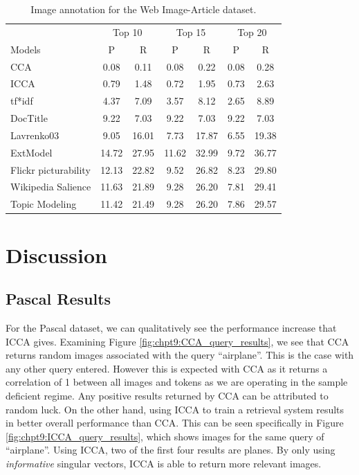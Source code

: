 \begin{table}[t]
\centering
\begin{tabular}{l|cc|cc|cc}
& \multicolumn{2}{|c|}{Top 10} & \multicolumn{2}{|c|}{Top 15} & \multicolumn{2}{|c|}{Top
  20}\\
Models & P & R & P & R & P & R\\ 
\midrule
CCA & 0.08 & 0.11 & 0.08 & 0.22 & 0.08 & 0.28\\
ICCA & 0.79 & 1.48 & 0.72 & 1.95 & 0.73 & 2.63\\
\midrule
\midrule
tf*idf & 4.37 & 7.09 & 3.57 & 8.12 & 2.65 & 8.89\\
DocTitle & 9.22 & 7.03 & 9.22 & 7.03 & 9.22 & 7.03\\
Lavrenko03 & 9.05 & 16.01 & 7.73 & 17.87 & 6.55 & 19.38\\
ExtModel & 14.72 & 27.95 & 11.62 & 32.99 & 9.72 & 36.77\\
\midrule
\midrule
Flickr picturability & 12.13 & 22.82 & 9.52 & 26.82 & 8.23 & 29.80\\
Wikipedia Salience & 11.63 & 21.89 & 9.28 & 26.20 & 7.81 & 29.41\\
Topic Modeling & 11.42 & 21.49 & 9.28 & 26.20 & 7.86 & 29.57\\
\bottomrule
\end{tabular}
\caption{Image annotation for the Web Image-Article dataset.}
\label{table:bbc}
\vspace{-0.1in}
\end{table}

\section{Discussion}\label{sec:disc}
\subsection{Pascal Results}

For the Pascal dataset, we can qualitatively see the performance increase that ICCA
gives. Examining Figure \ref{fig:chpt9:CCA_query_results}, we see that CCA returns random
images associated with the query ``airplane''. This is the case with any other query
entered.  However this is expected with CCA as it returns a correlation of 1 between all
images and tokens as we are operating in the sample deficient regime.  Any positive
results returned by CCA can be attributed to random luck. On the other hand, using ICCA to
train a retrieval system results in better overall performance than CCA. This can be seen
specifically in Figure \ref{fig:chpt9:ICCA_query_results}, which shows images for the same
query of ``airplane''. Using ICCA, two of the first four results are planes. By only using
\textit{informative} singular vectors, ICCA is able to return more relevant images.

